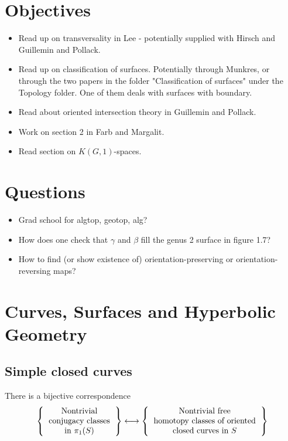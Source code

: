 \documentclass[reqno]{amsart}
\theoremstyle{definition}
\theoremstyle{remark}
\begin{document}
\section{Objectives}

\begin{itemize}
    \item Read up on transversality in Lee - potentially supplied with Hirsch
        and Guillemin and Pollack.
    \item Read up on classification of surfaces. Potentially
        through Munkres, or through the two papers in the folder
        "Classification of surfaces" under the Topology folder.
        One of them deals with surfaces with boundary.
    \item Read about oriented intersection theory in Guillemin and Pollack.
    \item Work on section 2 in Farb and Margalit.
    \item Read section on $K (G,1)$-spaces.
\end{itemize}

\section{Questions}

\begin{itemize}
    \item Grad school for algtop, geotop, alg?
    \item How does one check that $\gamma$ and $\beta$ fill
        the genus 2 surface in figure 1.7?
    \item How to find (or show existence of) orientation-preserving
        or orientation-reversing maps?
\end{itemize}


\newpage

\section{Curves, Surfaces and Hyperbolic Geometry}
\subsection{Simple closed curves}
There is a bijective correspondence
\[
\left\{ 
    \begin{tabular}{c}
    Nontrivial\\
    conjugacy classes\\
    in $\pi_1 (S)$
\end{tabular}
\right\} 
\longleftrightarrow
\left\{ 
    \begin{tabular}{c}
        Nontrivial free\\
        homotopy classes of oriented\\
        closed curves in $S$
\end{tabular}
\right\} 
\] 
\end{document}
